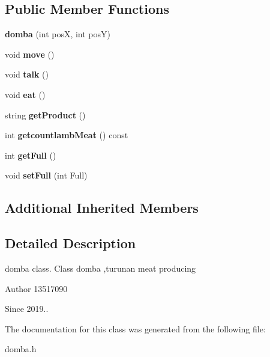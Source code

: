 \subsection*{Public Member Functions}
\begin{DoxyCompactItemize}
\item 
\mbox{\label{classdomba_a2b68f77b04b105d52ce1c3466d13c42a}} 
{\bfseries domba} (int posX, int posY)
\item 
\mbox{\label{classdomba_a5d3a6be6c7d3263a8084907c047d75b3}} 
void {\bfseries move} ()
\item 
\mbox{\label{classdomba_afbed61a200b204818b134c8c76412d55}} 
void {\bfseries talk} ()
\item 
\mbox{\label{classdomba_a6f69ece0cdb33fc266c11d204d49f2e9}} 
void {\bfseries eat} ()
\item 
\mbox{\label{classdomba_a5ceecede7e009bdeac36aa7ffcea9cee}} 
string {\bfseries get\+Product} ()
\item 
\mbox{\label{classdomba_adbcde54d183ee796eb13bf7bf0174864}} 
int {\bfseries getcountlamb\+Meat} () const
\item 
\mbox{\label{classdomba_aa54efee014f7803128d384b0b19672a6}} 
int {\bfseries get\+Full} ()
\item 
\mbox{\label{classdomba_a89fb54203e1c9bfb9859344d2903eecf}} 
void {\bfseries set\+Full} (int Full)
\end{DoxyCompactItemize}
\subsection*{Additional Inherited Members}


\subsection{Detailed Description}
domba class. Class domba ,turunan meat producing \begin{DoxyAuthor}{Author}
13517090 
\end{DoxyAuthor}
\begin{DoxySince}{Since}
2019.. 
\end{DoxySince}


The documentation for this class was generated from the following file\+:\begin{DoxyCompactItemize}
\item 
domba.\+h\end{DoxyCompactItemize}
